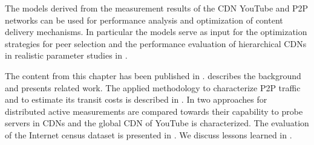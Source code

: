 The models derived from the measurement results of the CDN YouTube and P2P networks can be used for performance analysis and optimization of content delivery mechanisms.
In particular the models serve as input for the optimization strategies for peer selection and the performance evaluation of hierarchical CDNs in realistic parameter studies in .

The content from this chapter has been published in \cite{burger2012profit,burger2014vantage,burger2016hierarchical}.
 describes the background and presents related work.
The applied methodology to characterize P2P traffic and to estimate its transit costs is described in .
In  two approaches for distributed active measurements are compared towards their capability to probe servers in CDNs and the global CDN of YouTube is characterized.
The evaluation of the Internet census dataset is presented in .
We discuss lessons learned in .






